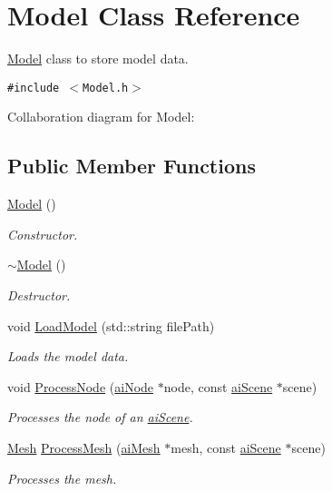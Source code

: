 \hypertarget{class_model}{
\section{Model Class Reference}
\label{class_model}
}
\hyperlink{class_model}{Model} class to store model data.  


{\tt \#include $<$Model.h$>$}

Collaboration diagram for Model:\subsection*{Public Member Functions}
\begin{CompactItemize}
\item 
\hyperlink{class_model_e3b375de5f6df4faf74a95d64748e048}{Model} ()
\begin{CompactList}\small\item\em Constructor. \item\end{CompactList}\item 
\hyperlink{class_model_d6ebd2062a0b823db841a0b88baac4c0}{$\sim$Model} ()
\begin{CompactList}\small\item\em Destructor. \item\end{CompactList}\item 
void \hyperlink{class_model_d7e2859170e157f9c6393b16e54c3fd8}{LoadModel} (std::string filePath)
\begin{CompactList}\small\item\em Loads the model data. \item\end{CompactList}\item 
void \hyperlink{class_model_9bb9d5cd67e4cd9dc95c01bedd92034a}{ProcessNode} (\hyperlink{structai_node}{aiNode} $\ast$node, const \hyperlink{structai_scene}{aiScene} $\ast$scene)
\begin{CompactList}\small\item\em Processes the node of an \hyperlink{structai_scene}{aiScene}. \item\end{CompactList}\item 
\hyperlink{class_mesh}{Mesh} \hyperlink{class_model_2cc9f43dc71e2781369f6106392e560e}{ProcessMesh} (\hyperlink{structai_mesh}{aiMesh} $\ast$mesh, const \hyperlink{structai_scene}{aiScene} $\ast$scene)
\begin{CompactList}\small\item\em Processes the mesh. \item\end{CompactList}\item 

\end{CompactItemize}
